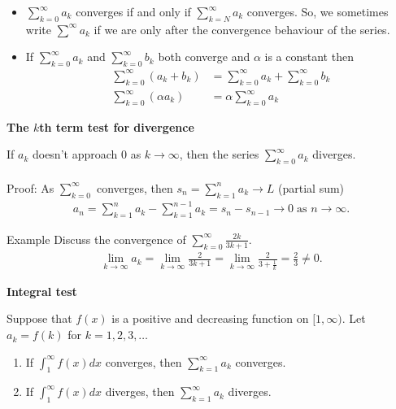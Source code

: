\documentclass{report}
\begin{document}
		\begin{itemize}
			\item $\displaystyle\sum_{k=0}^\infty a_k$ converges if and only if $\displaystyle\sum_{k=N}^\infty a_k$ converges. So, we sometimes write $\displaystyle\sum^\infty a_k$ if we are only after the convergence behaviour of the series.
			\item If $\displaystyle\sum_{k=0}^\infty a_k$ and $\displaystyle\sum_{k=0}^\infty b_k$ both converge and $\alpha$ is a constant then
				\begin{align*}
					\sum_{k=0}^\infty (a_k + b_k) &= \sum_{k=0}^\infty a_k + \sum_{k=0}^\infty b_k	\\
					\sum_{k=0}^\infty (\alpha a_k) &= \alpha \sum_{k=0}^\infty a_k
				\end{align*}
		\end{itemize}

		\textbf{The $k$th term test for divergence}

			If $a_k$ doesn't approach 0 as $ k \to \infty$, then the series $\displaystyle\sum_{k=0}^\infty a_k$ diverges.
			\\ \\
			Proof: As $\displaystyle\sum_{k=0}^\infty$ converges, then $s_n = \displaystyle\sum_{k=1}^n a_k \to L$ (partial sum)
			\begin{align*}
				a_n = \sum_{k=1}^n a_k - \sum_{k=1}^{n-1} a_k = s_n - s_{n-1} \to 0 \; \text{as } n \to \infty.
			\end{align*}

			\begin{question}{Example}
				Discuss the convergence of $\displaystyle\sum_{k=0}^\infty \frac{2k}{3k+1}$.
				\begin{align*}
					\lim_{k\to \infty} a_k = \lim_{k\to\infty} \frac{2}{3k+1} = \lim_{k \to \infty} \frac{2}{3+\frac{1}{k}} = \frac{2}{3} \neq 0.
				\end{align*}
			\end{question}

		\textbf{Integral test}

			Suppose that $f(x)$ is a positive and decreasing function on $[1, \infty)$. Let $a_k = f(k)$ for $k = 1,2,3,\dots$
			\begin{enumerate}
				\item If $\displaystyle\int_1^\infty f(x) dx$ converges, then $\displaystyle\sum_{k=1}^\infty a_k$ converges.
				\item If $\displaystyle\int_1^\infty f(x) dx$ diverges, then $\displaystyle\sum_{k=1}^\infty a_k$ diverges.
			\end{enumerate}
\end{document}
